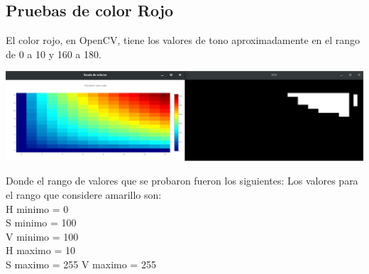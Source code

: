 \subsection{Pruebas de color Rojo}
El color rojo, en OpenCV, tiene los valores de tono aproximadamente en 
el rango de 0 a 10 y 160 a 180.
\begin{center}
    \includegraphics[width=1.0\textwidth]{Capitulo4/HSV_rojo.eps}       
    \label{Fig6}
\end{center}
Donde el rango de valores que se probaron fueron los siguientes:
Los valores para el rango que considere amarillo son:\\
H minimo  = 0\\
S minimo = 100 \\
V minimo = 100 \\
H maximo = 10 \\
S maximo = 255
V maximo = 255 

